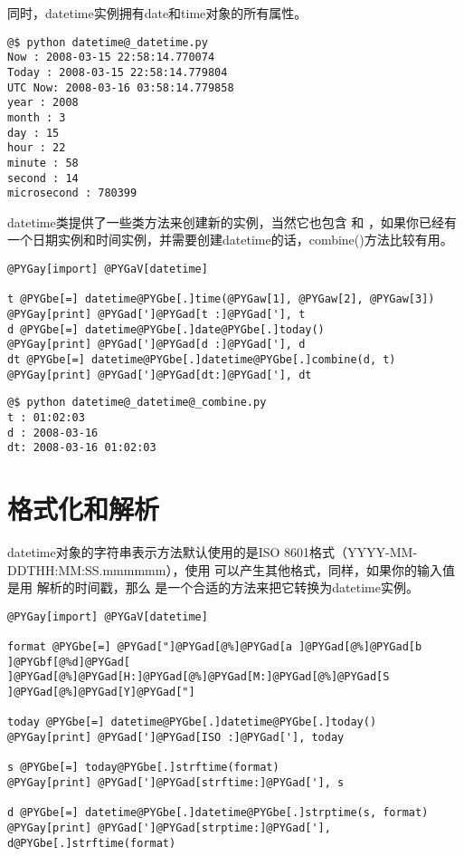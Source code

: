 \documentclass[a4paper,10pt,english]{manual}
\begin{document}
同时，datetime实例拥有date和time对象的所有属性。

\begin{Verbatim}[commandchars=@\[\]]
@$ python datetime@_datetime.py
Now : 2008-03-15 22:58:14.770074
Today : 2008-03-15 22:58:14.779804
UTC Now: 2008-03-16 03:58:14.779858
year : 2008
month : 3
day : 15
hour : 22
minute : 58
second : 14
microsecond : 780399
\end{Verbatim}

datetime类提供了一些类方法来创建新的实例，当然它也包含  和  ，如果你已经有一个日期实例和时间实例，并需要创建datetime的话，combine()方法比较有用。

\begin{Verbatim}[commandchars=@\[\]]
@PYGay[import] @PYGaV[datetime]

t @PYGbe[=] datetime@PYGbe[.]time(@PYGaw[1], @PYGaw[2], @PYGaw[3])
@PYGay[print] @PYGad[']@PYGad[t :]@PYGad['], t
d @PYGbe[=] datetime@PYGbe[.]date@PYGbe[.]today()
@PYGay[print] @PYGad[']@PYGad[d :]@PYGad['], d
dt @PYGbe[=] datetime@PYGbe[.]datetime@PYGbe[.]combine(d, t)
@PYGay[print] @PYGad[']@PYGad[dt:]@PYGad['], dt
\end{Verbatim}

\begin{Verbatim}[commandchars=@\[\]]
@$ python datetime@_datetime@_combine.py
t : 01:02:03
d : 2008-03-16
dt: 2008-03-16 01:02:03
\end{Verbatim}


\section{格式化和解析}

datetime对象的字符串表示方法默认使用的是ISO 8601格式（YYYY-MM-DDTHH:MM:SS.mmmmmm），使用  可以产生其他格式，同样，如果你的输入值是用  解析的时间戳，那么  是一个合适的方法来把它转换为datetime实例。

\begin{Verbatim}[commandchars=@\[\]]
@PYGay[import] @PYGaV[datetime]

format @PYGbe[=] @PYGad["]@PYGad[@%]@PYGad[a ]@PYGad[@%]@PYGad[b ]@PYGbf[@%d]@PYGad[ ]@PYGad[@%]@PYGad[H:]@PYGad[@%]@PYGad[M:]@PYGad[@%]@PYGad[S ]@PYGad[@%]@PYGad[Y]@PYGad["]

today @PYGbe[=] datetime@PYGbe[.]datetime@PYGbe[.]today()
@PYGay[print] @PYGad[']@PYGad[ISO :]@PYGad['], today

s @PYGbe[=] today@PYGbe[.]strftime(format)
@PYGay[print] @PYGad[']@PYGad[strftime:]@PYGad['], s

d @PYGbe[=] datetime@PYGbe[.]datetime@PYGbe[.]strptime(s, format)
@PYGay[print] @PYGad[']@PYGad[strptime:]@PYGad['], d@PYGbe[.]strftime(format)
\end{Verbatim}
\end{document}
